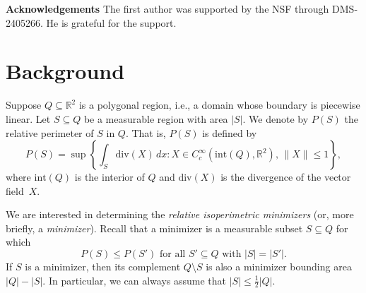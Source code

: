 \documentclass[leqno]{article}
\numberwithin{equation}{section}
\theoremstyle{definition}
\theoremstyle{remark}
\theoremstyle{plain}
\begin{document}
\begin{center}
    \label{fig:main}
\end{center}

\textbf{Acknowledgements}  The first author was supported by the NSF through DMS-2405266.  He is grateful for the support.



\section{Background}\label{sec:background}

Suppose $Q \subseteq \mathbb{R}^2$ is a polygonal region, i.e., a domain whose boundary is piecewise linear. Let $S\subseteq Q$ be a measurable region with area $|S|$. We denote by $P(S)$ the relative perimeter of $S$ in $Q$.  That is, $P(S)$ is defined by
\begin{equation*}
P(S)=\sup\left\{\int_S\textrm{div} (X)\,dx\colon X\in C^\infty_c(\text{int}(Q),\mathbb{R}^2),\,\|X\|\leq 1\right\},    
\end{equation*}
where $\text{int}(Q)$ is the interior of $Q$ and $\textrm{div} (X)$ is the divergence of the vector field~$X$.

We are interested in determining the \textit{relative isoperimetric minimizers} (or, more briefly, a \textit{minimizer}).  Recall that a minimizer is a measurable subset $S\subseteq Q$ for which  
\[
    P(S)\leq P(S') \text{ for all } S'\subseteq Q \text{ with } |S| = |S'|.  
\]
If $S$ is a minimizer, then its complement $Q \setminus S$ is also a minimizer bounding area $|Q| - |S|$.  In particular, we can always assume that $|S| \leq \frac{1}{2}|Q|$.
\end{document}
